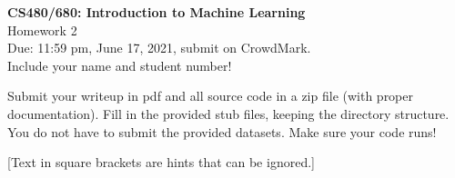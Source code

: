 \documentclass[10pt,letter,notitlepage]{article}
\begin{document}
\begin{center}
\large{\textbf{CS480/680: Introduction to Machine Learning} \\ Homework 2\\ Due: 11:59 pm, June 17, 2021, submit on CrowdMark.} \\

Include your name and student number!

\end{center}

\begin{center}
Submit your writeup in pdf and all source code in a zip file (with proper documentation). 
Fill in the provided stub files, keeping the directory structure. You do not have to submit the provided datasets.
Make sure your code runs!

[Text in square brackets are hints that can be ignored.]
\end{center}
\end{document}

